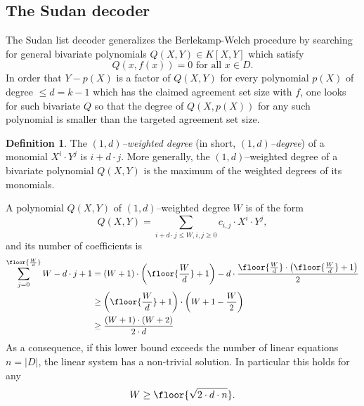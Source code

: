 \documentclass[11pt,article,oneside]{memoir}
\theoremstyle{definition}
\newtheorem{defn}[thm]{Definition}
\theoremstyle{remark}
\begin{document}
\subsection{The Sudan decoder}

The Sudan list decoder \cite{Sudan} generalizes the Berlekamp-Welch procedure by searching for general bivariate polynomials $Q(X,Y)\in K[X,Y]$ which satisfy
\[
Q(x,f(x)) = 0 \text{ for all } x\in D.
\]
In order that $Y-p(X)$ is a factor of $Q(X,Y)$ for every polynomial $p(X)$ of degree $\leq d=k-1$ which has the claimed agreement set size with $f$,  one looks for such bivariate $Q$ so that the degree of $Q(X,p(X))$ for any such polynomial is smaller than the targeted agreement set size.

\begin{defn}
The \textit{$(1,d)$--weighted degree} (in short, \textit{$(1,d)$--degree}) of a monomial $X^i\cdot Y^j$ is $i+d\cdot j$. 
More generally, the $(1,d)$--weighted degree of a  bivariate polynomial $Q(X,Y)$ is the maximum of the weighted degrees of its monomials.
\end{defn}

A polynomial $Q(X,Y)$ of $(1,d)$--weighted degree $W$ is of the form
\[
Q(X,Y) = \sum_{i+d\cdot j\leq W, i,j\geq 0} c_{i,j} \cdot X^i\cdot Y^j,
\]
and its number of coefficients is 
\begin{align*}
\sum_{j=0}^{\floor{\nicefrac{W}{d}}} W - d\cdot j+1 &= (W+1)\cdot \left(\floor{\frac{W}{d}}+ 1\right) - d\cdot \frac{\floor{\frac{W}{d}}\cdot\left(\floor{\frac{W}{d}}+1\right)}{2}
\\
& \geq \left(\floor{\frac{W}{d}}+ 1\right)\cdot \left(W + 1 - \frac{W}{2}\right)
\\
& \geq \frac{(W+1)\cdot (W+2)}{2\cdot d}
\end{align*}
As a consequence, if this lower bound exceeds the number of linear equations $n=|D|$, the linear system has a non-trivial solution.  
In particular this holds for any 
\[
W \geq \floor{\sqrt{2\cdot d\cdot n}}.
\]
\end{document}
